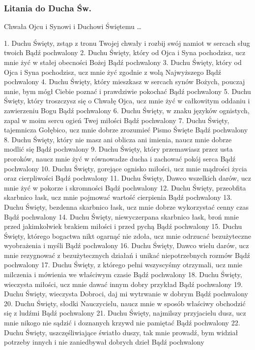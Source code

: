 \documentclass[twocolumn,fleqn,oneside,openany,a5paper,12pt]{book}
\def\mysec#1{\subsubsection*{#1}\addcontentsline{toc}{chapter}{#1}}
\begin{document}
\mysec{Litania do Ducha Św.}
{\obeycr
Chwała Ojcu i Synowi i Duchowi Świętemu …

1. Duchu Święty, zstąp z tronu Twojej chwały i rozbij swój  namiot w sercach sług twoich {\tiny Bądź pochwalony}
2. Duchu Święty, który od Ojca i Syna pochodzisz, ucz  mnie żyć w stałej obecności Bożej {\tiny Bądź pochwalony}
3. Duchu Święty, który od Ojca i Syna pochodzisz, ucz mnie żyć zgodnie z wolą Najwyższego {\tiny Bądź pochwalony}
4. Duchu Święty, który mieszkasz w sercach synów Bożych, pouczaj mnie, bym mógł Ciebie poznać i prawdziwie pokochać {\tiny Bądź pochwalony}
5. Duchu Święty, który troszczysz się o Chwałę Ojca,  ucz mnie żyć w całkowitym oddaniu i zawierzeniu Bogu {\tiny Bądź pochwalony}
6. Duchu Święty, w znaku języków ognistych, zapal w moim sercu ogień Twej miłości {\tiny Bądź pochwalony}
7. Duchu Święty, tajemnicza Gołębico, ucz mnie dobrze zrozumieć Pismo Święte {\tiny Bądź pochwalony}
8. Duchu Święty, który nie masz ani oblicza ani imienia,  naucz mnie dobrze modlić się {\tiny Bądź pochwalony}
9. Duchu Święty, który przemawiasz przez usta proroków, naucz mnie żyć w równowadze ducha i zachować pokój serca  {\tiny Bądź pochwalony}
10. Duchu Święty, gorejące ognisko miłości,  ucz mnie mądrości życia oraz cierpliwości {\tiny Bądź pochwalony}
11. Duchu Święty, Dawco wszelkich darów,  ucz mnie żyć w pokorze i skromności {\tiny Bądź pochwalony}
12. Duchu Święty, przeobfita skarbnico łask, ucz mnie pojmować wartość cierpienia {\tiny Bądź pochwalony}
13. Duchu Święty, bezdenna skarbnico łask, ucz mnie dobrze wykorzystać cenny czas {\tiny Bądź pochwalony}
14. Duchu Święty, niewyczerpana skarbnico łask, broń mnie przed jakimkolwiek brakiem miłości i przed pychą {\tiny Bądź pochwalony}
15. Duchu Święty, którego bogactwa nikt ogarnąć nie zdoła, ucz mnie odrzucać bezużyteczne wyobrażenia i myśli {\tiny Bądź pochwalony}
16. Duchu Święty, Dawco wielu darów, ucz mnie rezygnować z bezużytecznych działań i unikać niepotrzebnych rozmów {\tiny Bądź pochwalony}
17. Duchu Święty, z którego pełni wszyscyśmy otrzymali, ucz mnie milczenia i mówienia we właściwym czasie {\tiny Bądź pochwalony}
18. Duchu Święty, wieczysta miłości,  ucz mnie dawać innym dobry przykład {\tiny Bądź pochwalony}
19. Duchu Święty, wieczysta Dobroci, daj mi wytrwanie w dobrym {\tiny Bądź pochwalony}
20. Duchu Święty, słodki Nauczycielu, naucz mnie w sposób właściwy obchodzić się z ludźmi {\tiny Bądź pochwalony}
21. Duchu Święty, najmilszy przyjacielu dusz, ucz mnie nikogo nie sądzić i doznanych krzywd nie pamiętać {\tiny Bądź pochwalony}
22. Duchu Święty, uszczęśliwiające światło duszy, tak mnie prowadź, bym widział potrzeby innych i nie zaniedbywał dobrych dzieł {\tiny Bądź pochwalony}
}
\end{document}
